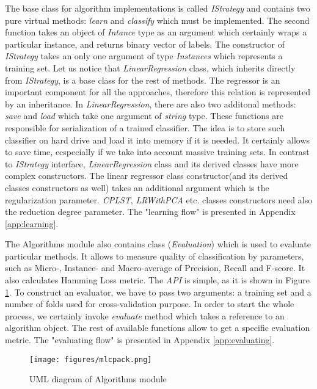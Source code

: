 The base class for algorithm implementations is called \textit{IStrategy} and contains two pure virtual methods: \textit{learn} and \textit{classify} which must be implemented. The second function takes an object of \textit{Intance} type as an argument which certainly wraps a particular instance, and returns binary vector of labels. The constructor of \textit{IStrategy} takes an only one argument of type \textit{Instances} which represents a training set.  Let us notice that \textit{LinearRegression} class, which inherits directly from \textit{IStrategy}, is a base class for the rest of methods. The regressor is an important component for all the approaches, therefore this relation is represented by an inheritance. In \textit{LinearRegression}, there are also two additonal methods: \textit{save} and \textit{load} which take one argument of \textit{string} type. These functions are responsible for serialization of a trained classifier. The idea is to store such classifier on hard drive and load it into memory if it is needed. It certainly allows to save time, ecspecially if we take into account massive training sets. In contrast to \textit{IStrategy} interface, \textit{LinearRegression} class and its derived classes have more complex constructors. The linear regressor class constructor(and its derived classes constructors as well) takes an additional argument which is the regularization parameter. \textit{CPLST}, \textit{LRWithPCA} etc. classes constructors need also the reduction degree parameter. The "learning flow" is presented in Appendix \ref{app:learning}.

The Algorithms module also contains class (\textit{Evaluation}) which is used to evaluate particular methods. It allows to measure quality of classification by parameters, such as Micro-, Instance- and Macro-average of Precision, Recall and F-score. It also calculates Hamming Loss metric. The \textit{API} is simple, as it is shown in Figure \ref{fig:alg_sh}. To construct an evaluator, we have to pass two arguments: a training set and a number of folds used for cross-validation purpose. In order to start the whole process, we certainly invoke \textit{evaluate} method which takes a reference to an algorithm object. The rest of available functions allow to get a specific evaluation metric. The "evaluating flow" is presented in Appendix \ref{app:evaluating}.

\begin{figure}
\centering
\caption{UML diagram of Algorithms module}
\label{fig:alg_sh}
\texttt{[image: figures/mlcpack.png]}
\end{figure}

